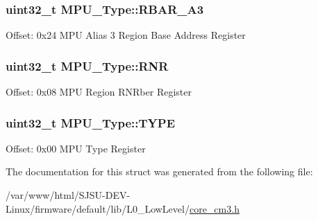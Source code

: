 \subsubsection[{\texorpdfstring{R\+B\+A\+R\+\_\+\+A3}{RBAR_A3}}]{ uint32\+\_\+t M\+P\+U\+\_\+\+Type\+::\+R\+B\+A\+R\+\_\+\+A3}\hypertarget{structMPU__Type_a9fda17c37b85ef317c7c8688ff8c5804}{}\label{structMPU__Type_a9fda17c37b85ef317c7c8688ff8c5804}
Offset\+: 0x24 M\+PU Alias 3 Region Base Address Register 
\subsubsection[{\texorpdfstring{R\+NR}{RNR}}]{ uint32\+\_\+t M\+P\+U\+\_\+\+Type\+::\+R\+NR}\hypertarget{structMPU__Type_afd8de96a5d574c3953e2106e782f9833}{}\label{structMPU__Type_afd8de96a5d574c3953e2106e782f9833}
Offset\+: 0x08 M\+PU Region R\+N\+Rber Register 
\subsubsection[{\texorpdfstring{T\+Y\+PE}{TYPE}}]{ uint32\+\_\+t M\+P\+U\+\_\+\+Type\+::\+T\+Y\+PE}\hypertarget{structMPU__Type_a6ae8a8c3a4909ae41447168d793608f7}{}\label{structMPU__Type_a6ae8a8c3a4909ae41447168d793608f7}
Offset\+: 0x00 M\+PU Type Register 

The documentation for this struct was generated from the following file\+:\begin{DoxyCompactItemize}
\item 
/var/www/html/\+S\+J\+S\+U-\/\+D\+E\+V-\/\+Linux/firmware/default/lib/\+L0\+\_\+\+Low\+Level/\hyperlink{core__cm3_8h}{core\+\_\+cm3.\+h}\end{DoxyCompactItemize}

